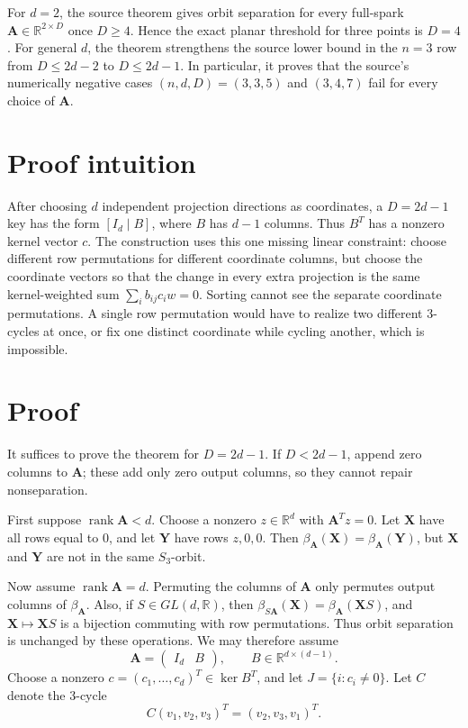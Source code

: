 \documentclass[11pt]{article}
\newcommand{\R}{\mathbb{R}}
\begin{document}
\noindent
For \(d=2\), the source theorem gives orbit separation for every full-spark
\(\mathbf A\in\R^{2\times D}\) once \(D\ge 4\).  Hence the exact planar
threshold for three points is \(D=4\).  For general \(d\), the theorem
strengthens the source lower bound in the \(n=3\) row from \(D\le 2d-2\) to
\(D\le 2d-1\).  In particular, it proves that the source's numerically
negative cases \((n,d,D)=(3,3,5)\) and \((3,4,7)\) fail for every choice of
\(\mathbf A\).

\section*{Proof intuition}

After choosing \(d\) independent projection directions as coordinates, a
\(D=2d-1\) key has the form \([I_d\mid B]\), where \(B\) has \(d-1\)
columns.  Thus \(B^T\) has a nonzero kernel vector \(c\).  The construction
uses this one missing linear constraint: choose different row permutations
for different coordinate columns, but choose the coordinate vectors so that
the change in every extra projection is the same kernel-weighted sum
\(\sum_i b_{ij}c_iw=0\).  Sorting cannot see the separate coordinate
permutations.  A single row permutation would have to realize two different
3-cycles at once, or fix one distinct coordinate while cycling another, which
is impossible.

\section*{Proof}

It suffices to prove the theorem for \(D=2d-1\).  If \(D<2d-1\), append zero
columns to \(\mathbf A\); these add only zero output columns, so they cannot
repair nonseparation.

First suppose \(\operatorname{rank}\mathbf A<d\).  Choose a nonzero
\(z\in\R^d\) with \(\mathbf A^Tz=0\).  Let \(\mathbf X\) have all rows equal
to \(0\), and let \(\mathbf Y\) have rows \(z,0,0\).  Then
\(\beta_{\mathbf A}(\mathbf X)=\beta_{\mathbf A}(\mathbf Y)\), but
\(\mathbf X\) and \(\mathbf Y\) are not in the same \(S_3\)-orbit.

Now assume \(\operatorname{rank}\mathbf A=d\).  Permuting the columns of
\(\mathbf A\) only permutes output columns of \(\beta_{\mathbf A}\).  Also,
if \(S\in GL(d,\R)\), then
\(\beta_{S\mathbf A}(\mathbf X)=\beta_{\mathbf A}(\mathbf XS)\), and
\(\mathbf X\mapsto \mathbf XS\) is a bijection commuting with row
permutations.  Thus orbit separation is unchanged by these operations.  We
may therefore assume
\[
  \mathbf A=\begin{pmatrix} I_d & B \end{pmatrix},
  \qquad B\in\R^{d\times(d-1)}.
\]
Choose a nonzero \(c=(c_1,\ldots,c_d)^T\in\ker B^T\), and let
\(J=\{i:c_i\ne0\}\).  Let \(C\) denote the 3-cycle
\[
  C(v_1,v_2,v_3)^T=(v_2,v_3,v_1)^T.
\]
\end{document}
